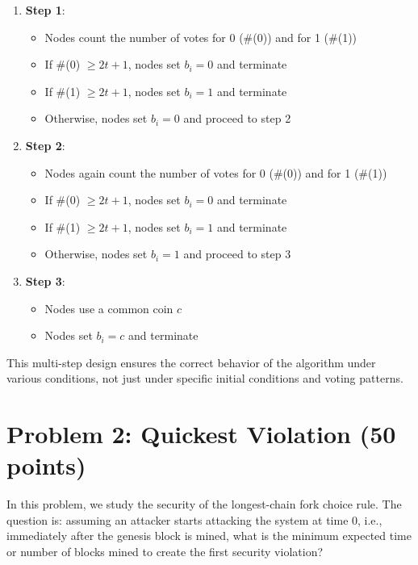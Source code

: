 \documentclass[12pt,a4paper]{article}
\begin{document}
\begin{enumerate}
    \item \textbf{Step 1}:
        \begin{itemize}
            \item Nodes count the number of votes for 0 (\#(0)) and for 1 (\#(1))
            \item If \#(0) $\geq 2t+1$, nodes set $b_i=0$ and terminate
            \item If \#(1) $\geq 2t+1$, nodes set $b_i=1$ and terminate
            \item Otherwise, nodes set $b_i=0$ and proceed to step 2
        \end{itemize}
    
    \item \textbf{Step 2}:
        \begin{itemize}
            \item Nodes again count the number of votes for 0 (\#(0)) and for 1 (\#(1))
            \item If \#(0) $\geq 2t+1$, nodes set $b_i=0$ and terminate
            \item If \#(1) $\geq 2t+1$, nodes set $b_i=1$ and terminate
            \item Otherwise, nodes set $b_i=1$ and proceed to step 3
        \end{itemize}
    
    \item \textbf{Step 3}:
        \begin{itemize}
            \item Nodes use a common coin $c$
            \item Nodes set $b_i=c$ and terminate
        \end{itemize}
\end{enumerate}

This multi-step design ensures the correct behavior of the algorithm under various conditions, not just under specific initial conditions and voting patterns.

\section{Problem 2: Quickest Violation (50 points)}

In this problem, we study the security of the longest-chain fork choice rule. The question is: assuming an attacker starts attacking the system at time 0, i.e., immediately after the genesis block is mined, what is the minimum expected time or number of blocks mined to create the first security violation?
\end{document}
